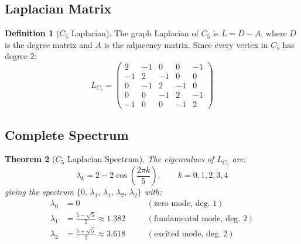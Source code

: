 \documentclass[11pt,a4paper]{article}
\newtheorem{theorem}{Theorem}[section]
\theoremstyle{definition}
\newtheorem{definition}[theorem]{Definition}
\begin{document}
\subsection{Laplacian Matrix}

\begin{definition}[$C_5$ Laplacian]
\label{S1:def:C5_laplacian}
The graph Laplacian of $C_5$ is $L = D - A$, where $D$ is the degree matrix and $A$ is the adjacency matrix. Since every vertex in $C_5$ has degree 2:
\begin{equation}
L_{C_5} = \begin{pmatrix}
2 & -1 & 0 & 0 & -1 \\
-1 & 2 & -1 & 0 & 0 \\
0 & -1 & 2 & -1 & 0 \\
0 & 0 & -1 & 2 & -1 \\
-1 & 0 & 0 & -1 & 2
\end{pmatrix}
\label{S1:eq:C5_laplacian}
\end{equation}
\end{definition}

\subsection{Complete Spectrum}

\begin{theorem}[$C_5$ Laplacian Spectrum]
\label{S1:thm:C5_spectrum}
The eigenvalues of $L_{C_5}$ are:
\begin{equation}
\lambda_k = 2 - 2\cos\!\left(\frac{2\pi k}{5}\right), \qquad k = 0,1,2,3,4
\label{S1:eq:C5_eigenvalues}
\end{equation}
giving the spectrum $\{0,\, \lambda_1,\, \lambda_1,\, \lambda_2,\, \lambda_2\}$ with:
\begin{align}
\lambda_0 &= 0 &\quad &(\text{zero mode, deg.\ 1}) \label{S1:eq:lam0}\\
\lambda_1 &= \frac{5 - \sqrt{5}}{2} \approx 1.382 &\quad &(\text{fundamental mode, deg.\ 2}) \label{S1:eq:lam1}\\
\lambda_2 &= \frac{5 + \sqrt{5}}{2} \approx 3.618 &\quad &(\text{excited mode, deg.\ 2}) \label{S1:eq:lam2}
\end{align}
\end{theorem}
\end{document}

